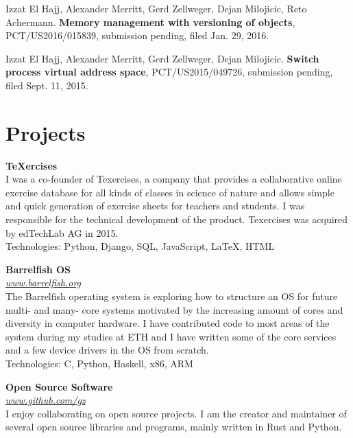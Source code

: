 \documentclass[margin,line]{resume}
\begin{document}
\begin{resume}
    Izzat El Hajj, Alexander Merritt, Gerd Zellweger, Dejan Milojicic, Reto
    Achermann. \textbf{Memory management with versioning of objects},
    PCT/US2016/015839, submission pending, filed Jan. 29, 2016.

    Izzat El Hajj, Alexander Merritt, Gerd Zellweger, Dejan Milojicic.
    \textbf{Switch process virtual address space}, PCT/US2015/049726, submission
    pending, filed Sept. 11, 2015.

    \pagebreak

    \section{\mysidestyle Projects}
    \textbf{{\TeX}ercises} \\\vspace{1mm}%
    I was a co-founder of Texercises, a company that provides a collaborative online
    exercise database for all kinds of classes in science of nature and allows
    simple and quick generation of exercise sheets for teachers and students. I was
    responsible for the technical development of the product. Texercises was
    acquired by edTechLab AG in 2015.\\
    Technologies: Python, Django, SQL, JavaScript, LaTeX, HTML

    \textbf{Barrelfish OS} \\\vspace{1mm}%
    \textsl{\url{www.barrelfish.org}} \hfill \\
    The Barrelfish operating system is exploring how to structure an OS for future
    multi- and many- core systems motivated by the increasing amount of cores and
    diversity in computer hardware. I have contributed code to most areas of the
    system during my studies at ETH and I have written some of the core services
    and a few device drivers in the OS from scratch.\\ Technologies: C, Python,
    Haskell, x86, ARM

    \textbf{Open Source Software} \\\vspace{1mm}%
    \textsl{\url{www.github.com/gz}} \hfill \\
    I enjoy collaborating on open source projects. I am the creator and maintainer
    of several open source libraries and programs, mainly written in Rust and
    Python.


\end{resume}
\end{document}
